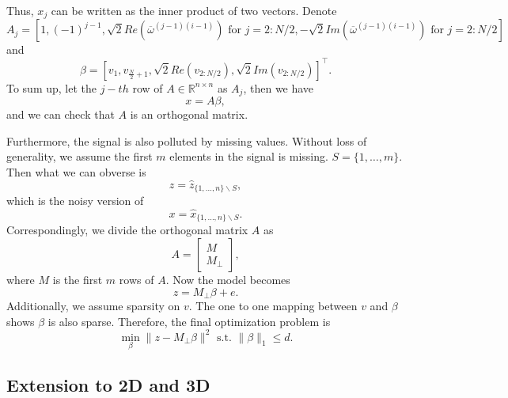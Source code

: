 \documentclass[final,onefignum,onetabnum]{siamart190516}
\begin{document}
Thus, $x_j$ can be written as the inner product of two vectors. Denote
\begin{equation}
    A_j = [1, (-1)^{j-1}, \sqrt{2}Re\left(\overline{\omega}^{(j-1)(i-1)}\right) \text{ for }j = 2:N/2, -\sqrt{2}Im\left(\overline{\omega}^{(j-1)(i-1)}\right) \text{ for }j = 2:N/2]
\end{equation}
and 
\begin{equation}\label{beta}
    \beta = [v_1, v_{\frac{N}{2}+1}, \sqrt{2}Re(v_{2:N/2}),  \sqrt{2}Im(v_{2:N/2})]^\top.
\end{equation}
To sum up, let the $j-th$ row of $A\in\mathbb{R}^{n\times n}$ as $A_j$, then we have
\begin{equation}
    x = A\beta,
\end{equation}
and we can check that $A$ is an orthogonal matrix.

Furthermore, the signal is also polluted by missing values. Without loss of generality, we assume the first $m$ elements in the signal is missing. $S = \{1,\dots,m\}$. Then what we can obverse is
\begin{equation}
    z = \widehat{z}_{\{1,\dots,n\}\backslash S},
\end{equation}
which is the noisy version of 
\begin{equation}
    x = \widehat{x}_{\{1,\dots,n\}\backslash S}.
\end{equation}
Correspondingly, we divide the orthogonal matrix $A$ as
\begin{equation}
    A = \begin{bmatrix}
    M\\
    M_{\perp}
    \end{bmatrix},
\end{equation}
where $M$ is the first $m$ rows of $A$. Now the model becomes
\begin{equation}
    z = M_{\perp}\beta + e.
\end{equation}
Additionally, we assume sparsity on $v$. The one to one mapping between $v$ and $\beta$ shows $\beta$ is also sparse. Therefore, the final optimization problem is
\begin{equation}
    \min_{\beta}\|z - M_{\perp}\beta\|^2 \text{ s.t. }\|\beta\|_1\leq d.
\end{equation}

\subsection{Extension to 2D and 3D}
\end{document}
